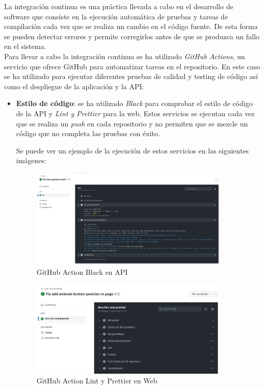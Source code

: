 La integración continua es una práctica llevada a cabo en el desarrollo de software que consiste en la ejecución
automática de pruebas y tareas de compilación cada vez que se realiza un cambio en el código fuente. De esta
forma se pueden detectar errores y permite corregirlos antes de que se produzca un fallo en el sistema. \\

Para llevar a cabo la integración continua se ha utilizado \textit{GitHub Actions}, un servicio que ofrece
GitHub para automatizar tareas en el repositorio. En este caso se ha utilizado para ejecutar diferentes pruebas
de calidad y testing de código así como el despliegue de la aplicación y la API:


\begin{itemize}
    \item \textbf{Estilo de código}: se ha utilizado \textit{Black} para comprobar el estilo de código de la
    API y \textit{Lint y Prettier} para la web. Estos servicios se ejecutan cada vez que se realiza un
    \textit{push} en cada repositorio y no permiten que se mezcle un código que no completa las pruebas con éxito.

    \newpage

    Se puede ver un ejemplo de la ejecución de estos servicios en las siguientes imágenes: \\

    \begin{figure}[H]
        \centering
        \includegraphics[width=0.9\textwidth]{imgs/black-action.png}
        \caption{GitHub Action Black en API}
        \label{fig:black-action}
    \end{figure}

    \begin{figure}[H]
        \centering
        \includegraphics[width=0.9\textwidth]{imgs/lint-prettier-action.png}
        \caption{GitHub Action Lint y Prettier en Web}
        \label{fig:lint-prettier-action}
    \end{figure}


\end{itemize}

